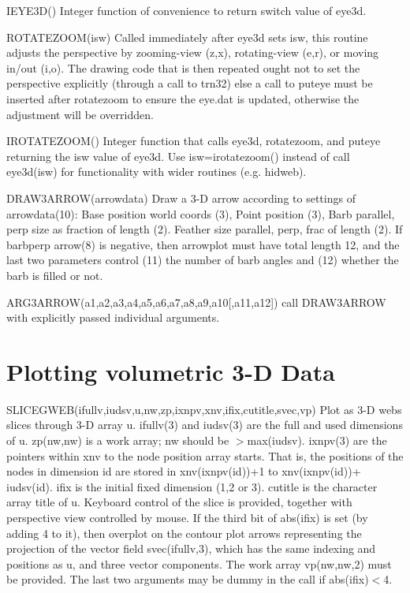 \documentclass[12pt]{article}
\newif \iftth
\begin{document}
IEYE3D() Integer function of convenience to return switch value of eye3d.

ROTATEZOOM(isw) Called immediately after eye3d sets isw, this routine
adjusts the perspective by zooming-view (z,x), rotating-view (e,r), or
moving in/out (i,o). The drawing code that is then repeated ought not
to set the perspective explicitly (through a call to trn32) else a
call to puteye must be inserted after rotatezoom to ensure the eye.dat
is updated, otherwise the adjustment will be overridden.

IROTATEZOOM() Integer function that calls eye3d, rotatezoom, and
puteye returning the isw value of eye3d. Use isw=irotatezoom() instead
of call eye3d(isw) for functionality with wider routines (e.g. hidweb). 

DRAW3ARROW(arrowdata) Draw a 3-D arrow according to settings of
arrowdata(10): Base position world coords (3), Point position (3),
Barb parallel, perp size as fraction of length (2). 
Feather size parallel, perp, frac of length (2). If barbperp arrow(8)
is negative, then arrowplot must have total length 12, and the last
two parameters control (11) the number of barb angles and (12) whether the barb
is filled or not.

ARG3ARROW(a1,a2,a3,a4,a5,a6,a7,a8,a9,a10[,a11,a12]) call DRAW3ARROW
with explicitly passed individual arguments.

\section{Plotting volumetric 3-D Data}

\iftth \special{html:<a href="slicetest.f"><img align="left"
src="sgweb.jpg" width="400"></a>}\fi


SLICEGWEB(ifullv,iudsv,u,nw,zp,ixnpv,xnv,ifix,cutitle,svec,vp) Plot
as 3-D webs slices through 3-D array u. ifullv(3) and iudsv(3) are the
full and used dimensions of u. zp(nw,nw) is a work array; nw should be
$>$max(iudsv). ixnpv(3) are the pointers within xnv to the node
position array starts. That is, the positions of the nodes in
dimension id are stored in xnv(ixnpv(id))+1 to xnv(ixnpv(id))+
iudsv(id). ifix is the initial fixed dimension (1,2 or 3). cutitle is
the character array title of u. Keyboard control of the slice is
provided, together with perspective view controlled by mouse. If the
third bit of abs(ifix) is set (by adding 4 to it), then overplot on
the contour plot arrows representing the projection of the vector
field svec(ifullv,3), which has the same indexing and positions as u,
and three vector components. The work array vp(nw,nw,2) must be
provided.  The last two arguments may be dummy in the call if
abs(ifix)$<$4.
\end{document}
